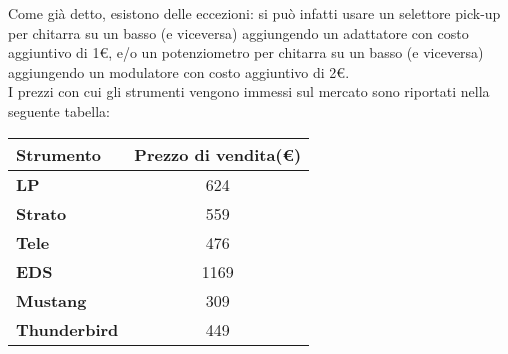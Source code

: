 \begin{table}[htbp]
\end{table}

Come già detto, esistono delle eccezioni: si può infatti usare un selettore pick-up per chitarra su un basso (e viceversa) aggiungendo un adattatore con costo aggiuntivo di 1\euro , e/o un potenziometro per chitarra su un basso (e viceversa) aggiungendo un modulatore con costo aggiuntivo di 2\euro . \\
\newpage
I prezzi con cui gli strumenti vengono immessi sul mercato sono riportati nella seguente tabella:

\begin{table}[htbp]
\begin{center}
\begin{tabular}{|l|c|}
\hline
\textbf{Strumento} & \textbf{Prezzo di vendita(\euro )} \\ \hline
\textbf{LP}                 &  624                          \\ \hline
\textbf{Strato}             &  559                          \\ \hline
\textbf{Tele}               &  476                          \\ \hline
\textbf{EDS}                &  1169                          \\ \hline
\textbf{Mustang}            &  309                          \\ \hline
\textbf{Thunderbird}        &  449                          \\ \hline
\end{tabular}
\end{center}
\end{table}

